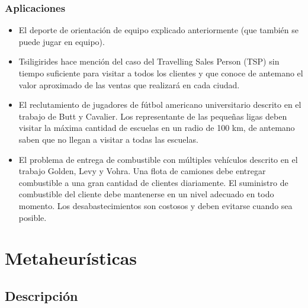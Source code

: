 \documentclass{beamer}
\begin{document}
\begin{frame}
\frametitle{Aplicaciones}

\begin{itemize}
	\item El deporte de orientación de equipo explicado anteriormente (que también se puede jugar en equipo).
	\pause
	\item Tsiligirides hace mención del caso del Travelling Sales Person (TSP) sin tiempo suficiente para visitar a todos los clientes y que conoce de antemano el valor aproximado de las ventas que realizará en cada ciudad.
	\pause
	\item El reclutamiento de jugadores de fútbol americano universitario descrito en el trabajo de Butt y Cavalier. Los representante de las pequeñas ligas deben visitar la máxima cantidad de escuelas en un radio de 100 km, de antemano saben que no llegan a visitar a todas las escuelas.
	\pause
	\item El problema de entrega de combustible con múltiples vehículos descrito en el trabajo Golden, Levy y Vohra. Una flota de camiones debe entregar combustible a una gran cantidad de clientes diariamente. El suministro de combustible del cliente debe mantenerse en un nivel adecuado en todo momento. Los desabastecimientos son costosos y deben evitarse cuando sea posible.
\end{itemize}

\end{frame}


\section{Metaheurísticas}
\subsection{Descripción}
\end{document}
